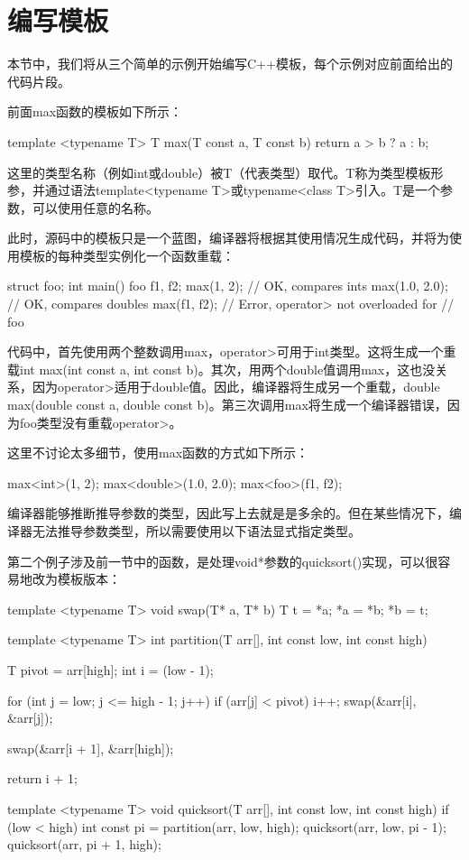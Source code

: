 \section{编写模板}
本节中，我们将从三个简单的示例开始编写C++模板，每个示例对应前面给出的代码片段。

前面max函数的模板如下所示：

\begin{cppcode}
template <typename T>
T max(T const a, T const b)
{
	return a > b ? a : b;
}
\end{cppcode}

这里的类型名称（例如int或double）被T（代表类型）取代。T称为类型模板形参，并通过语法template<typename T>或typename<class T>引入。T是一个参数，可以使用任意的名称。

此时，源码中的模板只是一个蓝图，编译器将根据其使用情况生成代码，并将为使用模板的每种类型实例化一个函数重载：

\begin{cppcode}
struct foo{};
int main()
{
	foo f1, f2;
	max(1, 2); // OK, compares ints
	max(1.0, 2.0); // OK, compares doubles
	max(f1, f2); // Error, operator> not overloaded for
	             // foo
}
\end{cppcode}

代码中，首先使用两个整数调用max，operator>可用于int类型。这将生成一个重载int max(int const a, int const b)。其次，用两个double值调用max，这也没关系，因为operator>适用于double值。因此，编译器将生成另一个重载，double max(double const a, double const b)。第三次调用max将生成一个编译器错误，因为foo类型没有重载operator>。

这里不讨论太多细节，使用max函数的方式如下所示：

\begin{cppcode}
max<int>(1, 2);
max<double>(1.0, 2.0);
max<foo>(f1, f2);
\end{cppcode}

编译器能够推断推导参数的类型，因此写上去就是是多余的。但在某些情况下，编译器无法推导参数类型，所以需要使用以下语法显式指定类型。

第二个例子涉及前一节中的函数，是处理void*参数的quicksort()实现，可以很容易地改为模板版本：

\begin{cppcode}
template <typename T>
void swap(T* a, T* b)
{
	T t = *a;
	*a = *b;
	*b = t;
}

template <typename T>
int partition(T arr[], int const low, int const high)
{
	T pivot = arr[high];
	int i = (low - 1);
	
	for (int j = low; j <= high - 1; j++)
	{
		if (arr[j] < pivot)
		{
			i++;
			swap(&arr[i], &arr[j]);
		}
	}

	swap(&arr[i + 1], &arr[high]);
	
	return i + 1;
}

template <typename T>
void quicksort(T arr[], int const low, int const high)
{
	if (low < high)
	{
		int const pi = partition(arr, low, high);
		quicksort(arr, low, pi - 1);
		quicksort(arr, pi + 1, high);
	}
}
\end{cppcode}

